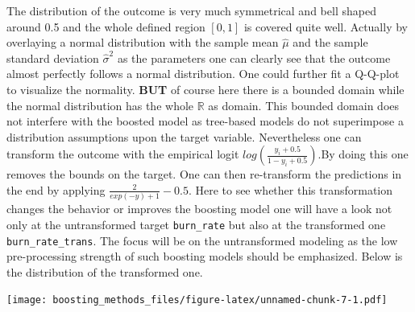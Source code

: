 \documentclass[
]{book}
\newenvironment{Shaded}{\begin{snugshade}}{\end{snugshade}}
\newcommand{\CommentTok}[1]{\textcolor[rgb]{0.56,0.35,0.01}{\textit{#1}}}
\newcommand{\FloatTok}[1]{\textcolor[rgb]{0.00,0.00,0.81}{#1}}
\newcommand{\FunctionTok}[1]{\textcolor[rgb]{0.00,0.00,0.00}{#1}}
\newcommand{\NormalTok}[1]{#1}
\newcommand{\OtherTok}[1]{\textcolor[rgb]{0.56,0.35,0.01}{#1}}
\newcommand{\SpecialCharTok}[1]{\textcolor[rgb]{0.00,0.00,0.00}{#1}}
\begin{document}
The distribution of the outcome is very much symmetrical and bell shaped around 0.5 and the whole defined region \([0,1]\) is covered quite well. Actually by overlaying a normal distribution with the sample mean \(\hat{\mu}\) and the sample standard deviation \(\hat{\sigma}^2\) as the parameters one can clearly see that the outcome almost perfectly follows a normal distribution. One could further fit a Q-Q-plot to visualize the normality. \textbf{BUT} of course here there is a bounded domain while the normal distribution has the whole \(\mathbb{R}\) as domain. This bounded domain does not interfere with the boosted model as tree-based models do not superimpose a distribution assumptions upon the target variable. Nevertheless one can transform the outcome with the empirical logit \(log(\frac{y_i+0.5}{1-y_i+0.5})\).By doing this one removes the bounds on the target. One can then re-transform the predictions in the end by applying \(\frac{2}{exp(-y)+1}-0.5\). Here to see whether this transformation changes the behavior or improves the boosting model one will have a look not only at the untransformed target \texttt{burn\_rate} but also at the transformed one \texttt{burn\_rate\_trans}. The focus will be on the untransformed modeling as the low pre-processing strength of such boosting models should be emphasized. Below is the distribution of the transformed one.

\begin{Shaded}
\end{Shaded}

\texttt{[image: boosting\_methods\_files/figure-latex/unnamed-chunk-7-1.pdf]}
\end{document}
